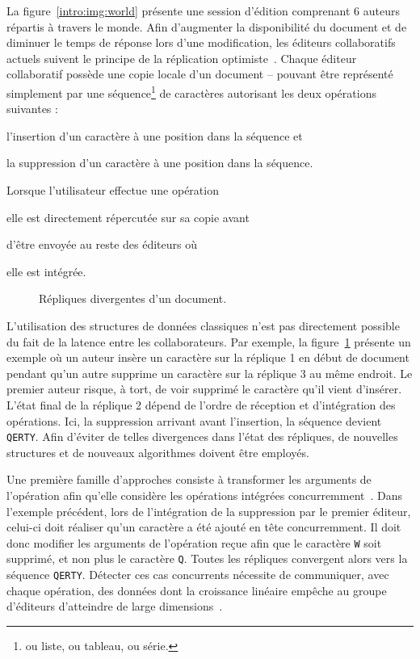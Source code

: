 La figure~\ref{intro:img:world} présente une session d'édition comprenant 6
auteurs répartis à travers le monde. Afin d'augmenter la disponibilité du
document et de diminuer le temps de réponse lors d'une modification, les
éditeurs collaboratifs actuels suivent le principe de la réplication
optimiste~\cite{saito2005optimistic}. Chaque éditeur collaboratif possède une
copie locale d'un document -- pouvant être représenté simplement par une
séquence\footnote{ou liste, ou tableau, ou série.} de caractères autorisant les
deux opérations suivantes :
\begin{inparaenum}[(a)]
\item l'insertion d'un caractère à une position dans la séquence et
\item la suppression d'un caractère à une position dans la séquence.
\end{inparaenum}
Lorsque l'utilisateur effectue une opération
\begin{inparaenum}[(i)]
\item elle est directement répercutée sur sa copie avant
\item d'être envoyée au reste des éditeurs où
\item elle est intégrée.
\end{inparaenum}


\begin{figure}
  
  \caption{\label{intro:fig:ripconvergence} Répliques divergentes d'un
    document.}
\end{figure}

L'utilisation des structures de données \og classiques \fg n'est pas directement
possible du fait de la latence entre les collaborateurs. Par exemple, la
figure~\ref{intro:fig:ripconvergence} présente un exemple où un auteur insère un
caractère sur la réplique 1 en début de document pendant qu'un autre supprime un
caractère sur la réplique 3 au même endroit. Le premier auteur risque, à tort,
de voir supprimé le caractère qu'il vient d'insérer. L'état final de la réplique
2 dépend de l'ordre de réception et d'intégration des opérations. Ici, la
suppression arrivant avant l'insertion, la séquence devient \texttt{QERTY}.
Afin d'éviter de telles divergences dans l'état des répliques, de nouvelles
structures et de nouveaux algorithmes doivent être employés.

Une première famille d'approches consiste à transformer les arguments de
l'opération afin qu'elle considère les opérations intégrées
concurremment~\cite{sun1998operational}. Dans l'exemple précédent, lors de
l'intégration de la suppression par le premier éditeur, celui-ci doit réaliser
qu'un caractère a été ajouté en tête concurremment. Il doit donc modifier les
arguments de l'opération reçue afin que le caractère \texttt{W} soit supprimé,
et non plus le caractère \texttt{Q}. Toutes les répliques convergent alors vers
la séquence \texttt{QERTY}.  Détecter ces cas concurrents nécessite de
communiquer, avec chaque opération, des données dont la croissance linéaire
empêche au groupe d'éditeurs d'atteindre de large
dimensions~\cite{charronbost1991concerning, sun2009contextbased}.

